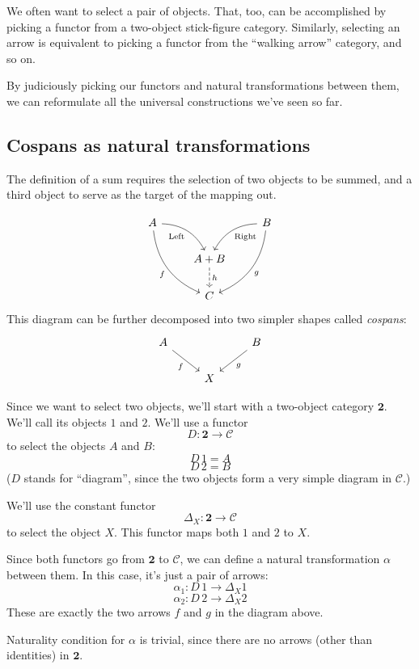 \documentclass[DaoFP]{subfiles}
\begin{document}
We often want to select a pair of objects. That, too, can be accomplished by picking a functor from a two-object stick-figure category. Similarly, selecting an arrow is equivalent to picking a functor from the ``walking arrow'' category, and so on.

By judiciously picking our functors and natural transformations between them, we can reformulate all the universal constructions we've seen so far.

\subsection{Cospans as natural transformations}

The definition of a sum requires the selection of two objects to be summed, and a third object to serve as the target of the mapping out.

\[
 \begin{tikzcd}
 A
 \arrow[dr,  bend left, "\text{Left}"']
 \arrow[ddr, bend right, "f"']
 && B
 \arrow[dl, bend right, "\text{Right}"]
 \arrow[ddl, bend left, "g"]
 \\
&A + B
\arrow[d, dashed, "h"]
\\
& C
 \end{tikzcd}
\]
This diagram can be further decomposed into two simpler shapes called \emph{cospans}:
\[
 \begin{tikzcd}
 A
 \arrow[dr, "f"']
 && B
 \arrow[dl, "g"]
 \\
 & X
 \end{tikzcd}
\]

Since we want to select two objects, we'll start with a two-object category $\mathbf{2}$. We'll call its objects $1$ and $2$. 
We'll use a functor 
\[ D \colon \mathbf{2} \to \mathcal{C}\]
to select the objects $A$ and $B$: 
\[D\, 1 = A\]
\[ D\, 2 = B \]
($D$ stands for ``diagram'', since the two objects form a very simple diagram in $\mathcal{C}$.)

We'll use the constant functor 
\[ \Delta_X \colon \mathbf{2} \to \mathcal{C} \]
to select the object $X$. This functor maps both $1$ and $2$ to $X$.

Since both functors go from $\mathbf{2}$ to $\mathcal{C}$, we can define a natural transformation $\alpha$ between them. In this case, it's just a pair of arrows:
\[ \alpha_1 \colon D \, 1 \to \Delta_X 1 \]
\[ \alpha_2 \colon D \, 2 \to \Delta_X 2 \]
These are exactly the two arrows $f$ and $g$ in the diagram above. 

Naturality condition for $\alpha$ is trivial, since there are no arrows (other than identities) in $\mathbf{2}$.
\end{document}
